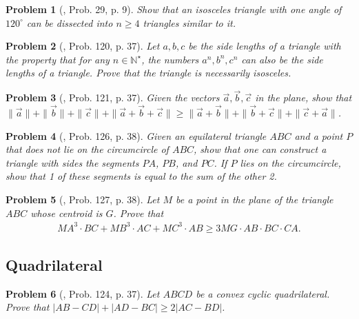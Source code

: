 \documentclass[oneside]{book}
\numberwithin{equation}{section}
\newtheorem{problem}{Problem}[section]
\begin{document}
\begin{problem}[\cite{Gelca_Andreescu2017}, Prob. 29, p. 9]
	Show that an isosceles triangle with one angle of $120^\circ$ can be dissected into $n\ge 4$ triangles similar to it.
\end{problem}

\begin{problem}[\cite{Gelca_Andreescu2017}, Prob. 120, p. 37]
	Let $a,b,c$ be the side lengths of a triangle with the property that for any $n\in\mathbb{N}^\star$, the numbers $a^n,b^n,c^n$ can also be the side lengths of a triangle. Prove that the triangle is necessarily isosceles.
\end{problem}

\begin{problem}[\cite{Gelca_Andreescu2017}, Prob. 121, p. 37]
	Given the vectors $\vec{a},\vec{b},\vec{c}$ in the plane, show that $\|\vec{a}\| + \|\vec{b}\| + \|\vec{c}\| + \|\vec{a} + \vec{b} + \vec{c}\|\ge\|\vec{a} + \vec{b}\| + \|\vec{b} + \vec{c}\| + \|\vec{c} + \vec{a}\|$.
\end{problem}

\begin{problem}[\cite{Gelca_Andreescu2017}, Prob. 126, p. 38]
	Given an equilateral triangle $ABC$ and a point $P$ that does not lie on the circumcircle of $ABC$, show  that one can construct a triangle with sides the segments $PA$, $PB$, and $PC$. If $P$ lies on the circumcircle, show that 1 of these segments is equal to the sum of the other 2.
\end{problem}

\begin{problem}[\cite{Gelca_Andreescu2017}, Prob. 127, p. 38]
	Let $M$ be a point in the plane of the triangle $ABC$ whose centroid is $G$. Prove that
	\begin{align*}
		MA^3\cdot BC + MB^3\cdot AC + MC^3\cdot AB\ge 3MG\cdot AB\cdot BC\cdot CA.
	\end{align*}
\end{problem}

\subsection{Quadrilateral}

\begin{problem}[\cite{Gelca_Andreescu2017}, Prob. 124, p. 37]
	Let $ABCD$ be a convex cyclic quadrilateral. Prove that $|AB - CD| + |AD - BC|\ge 2|AC - BD|$.
\end{problem}
\end{document}
